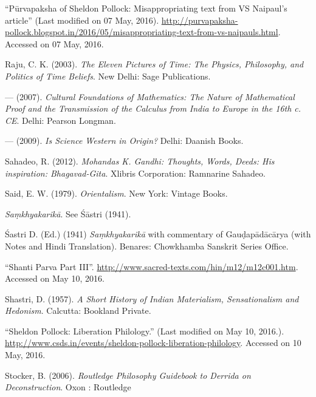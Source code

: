 \begin{thebibliography}{99}
``Pūrvapaksha of Sheldon Pollock: Misappropriating text from VS Naipaul's article'' (Last modified on 07 May, 2016). \url{http://purvapaksha-pollock.blogspot.in/2016/05/misappropriating-text-from-vs-naipauls.html}. Accessed on 07 May, 2016.

Raju, C. K. (2003). {\sl The Eleven Pictures of Time: The Physics, Philosophy, and Politics of Time Beliefs}. New Delhi: Sage Publications.

--- (2007). {\sl Cultural Foundations of Mathematics: The Nature of Mathematical Proof and the Transmission of the Calculus from India to Europe in the 16th c. CE}. Delhi: Pearson Longman.

--- (2009). {\sl Is Science Western in Origin?} Delhi: Daanish Books.

Sahadeo, R. (2012). {\sl Mohandas K. Gandhi: Thoughts, Words, Deeds: His inspiration: Bhagavad-Gita}. Xlibris Corporation: Ramnarine Sahadeo.

Said, E. W. (1979). {\sl Orientalism}. New York: Vintage Books.

{\sl Saṃkhyakarikā}. See Śāstri (1941).

Śastri D. (Ed.) (1941) {\sl Saṃkhyakarikā} with commentary of Gauḍapādācārya (with Notes and Hindi Translation). Benares: Chowkhamba Sanskrit Series Office.

``Shanti Parva Part III''. \url{http://www.sacred-texts.com/hin/m12/m12c001.htm}. Accessed on May 10, 2016.


Shastri, D. (1957). {\sl A Short History of Indian Materialism, Sensationalism and Hedonism}. Calcutta: Bookland Private.

``Sheldon Pollock: Liberation Philology.'' (Last modified on May 10, 2016.). \url{http://www.csds.in/events/sheldon-pollock-liberation-philology}. Accessed on 10 May, 2016.

Stocker, B. (2006). {\sl Routledge Philosophy Guidebook to Derrida on Deconstruction}. Oxon : Routledge

\end{thebibliography}

\theendnotes
\label{chapter\thechapter:end}
